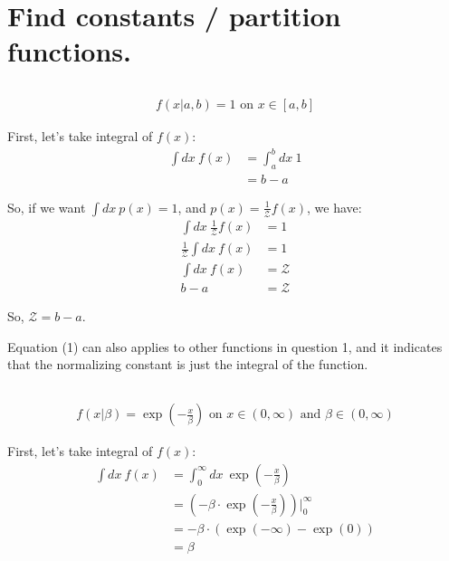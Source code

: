 \newcommand\chapternumber{2}

\usepackage{enumerate}
\usepackage{float}



\section{Find constants / partition functions.}
\subsection{}
\begin{align*}
    f(x|a,b) = 1 \text{ on } x \in [a,b]
\end{align*}

First, let's take integral of $f(x)$:
\begin{align*}
    \int dx\ f(x)
    &= \int_a^b dx\ 1 \\
    &= b-a
\end{align*}

So, if we want $\int dx\ p(x) = 1$, and $p(x) = \frac{1}{\mathcal{Z}} f(x)$, we have:
\begin{align}
    \int dx\ \frac{1}{\mathcal{Z}} f(x) &= 1 \nonumber \\
    \frac{1}{\mathcal{Z}} \int dx\  f(x) &= 1 \nonumber \\
    \int dx\ f(x) &= \mathcal{Z}  \\
    b-a &= \mathcal{Z} \nonumber 
\end{align}

So, $\mathcal{Z} = b-a$. 

Equation (1) can also applies to other functions in question 1, and it indicates that the normalizing constant is just the integral of the function.

\subsection{}
\begin{align*}
    f(x|\beta) = \exp(-\frac{x}{\beta}) \text{ on } x \in (0,\infty) \text{ and } \beta \in (0, \infty)
\end{align*}

First, let's take integral of $f(x)$:
\begin{align*}
    \int dx\ f(x) 
    &= \int_0^{\infty} dx\ \exp(-\frac{x}{\beta}) \\
    &= (-\beta \cdot \exp(-\frac{x}{\beta})) \biggr\rvert _0^{\infty} \\
    &= -\beta \cdot (\exp(-\infty)-\exp(0)) \\
    &= \beta 
\end{align*}

